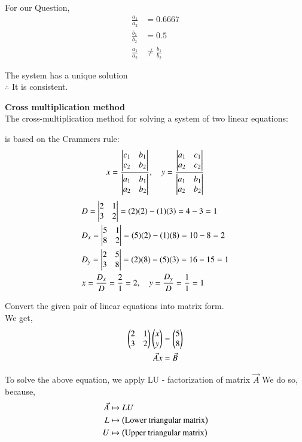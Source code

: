 \documentclass[journal]{IEEEtran}
\numberwithin{equation}{enumi}
\numberwithin{figure}{enumi}
\begin{document}
For our Question, 
\begin{align}
   \frac{a_1}{a_2} &= 0.6667\\
   \frac{b_1}{b_2} &= 0.5\\
   \frac{a_1}{a_2} &\neq \frac{b_1}{b_2}
\end{align}

The system has a unique solution \\
$\therefore$ It is consistent.

\textbf{Cross multiplication method}\\
The cross-multiplication method for solving a system of two linear equations:

is based on the Crammers rule:
\begin{align}
    x = \frac{\begin{vmatrix}c_1 & b_1\\ c_2 & b_2\end{vmatrix}}{\begin{vmatrix}a_1 & b_1 \\ a_2 & b_2\end{vmatrix}}, \quad y = \frac{\begin{vmatrix}a_1 & c_1 \\ a_2 & c_2\end{vmatrix}}{\begin{vmatrix}a_1 & b_1 \\ a_2 & b_2\end{vmatrix}}
\end{align}
\begin{align}
& D = \begin{vmatrix} 2 & 1 \\ 3 & 2 \end{vmatrix} = (2)(2) - (1)(3) = 4 - 3 = 1 \\
& D_x = \begin{vmatrix} 5 & 1 \\ 8 & 2 \end{vmatrix} = (5)(2) - (1)(8) = 10 - 8 = 2 \\
& D_y = \begin{vmatrix} 2 & 5 \\ 3 & 8 \end{vmatrix} = (2)(8) - (5)(3) = 16 - 15 = 1 \\
& x = \frac{D_x}{D} = \frac{2}{1} = 2, \quad y = \frac{D_y}{D} = \frac{1}{1} = 1\\
\end{align}

Convert the given pair of linear equations into matrix form.\\
We get, 
\begin{align}
    \begin{pmatrix}2 & 1 \\ 3 & 2 \end{pmatrix}\begin{pmatrix}x \\ y\end{pmatrix} &= \begin{pmatrix}5 \\ 8\end{pmatrix}\\
    \Vec{A}x &= \Vec{B} \label{A:}
\end{align}

To solve the above equation, we apply LU - factorization of matrix $\Vec{A}$
We do so, because,
\begin{align}
    \Vec{A} &\mapsto LU\\
    L &\mapsto \left(\text{Lower triangular matrix}\right)\\
    U &\mapsto \left(\text{Upper triangular matrix}\right)
\end{align}
\end{document}

